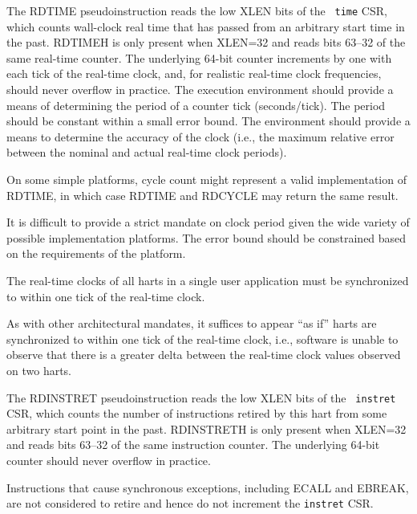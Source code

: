 The RDTIME pseudoinstruction reads the low XLEN bits of the {\tt
  time} CSR, which counts wall-clock real time that has passed from an
arbitrary start time in the past.
RDTIMEH is only present when XLEN=32 and reads bits 63--32 of the same
real-time counter.
The underlying 64-bit counter increments by one with each tick of the
real-time clock, and, for realistic real-time clock frequencies, should never
overflow in practice.
The execution environment should provide a means of determining the period of
a counter tick (seconds/tick).
The period should be constant within a small error bound.
The environment should provide a means to determine the accuracy of the clock
(i.e., the maximum relative error between the nominal and actual real-time
clock periods).

\begin{commentary}
On some simple platforms, cycle count might represent a valid
implementation of RDTIME, in which case RDTIME and RDCYCLE may
return the same result.

It is difficult to provide a strict mandate on clock period given the
wide variety of possible implementation platforms.  The error bound
should be constrained based on the requirements of the platform.
\end{commentary}

The real-time clocks of all harts in a single user application
must be synchronized to within one tick of the real-time clock.

\begin{commentary}
As with other architectural mandates, it suffices to appear ``as if''
harts are synchronized to within one tick of the real-time clock,
i.e., software is unable to observe that there is a greater delta
between the real-time clock values observed on two harts.
\end{commentary}

The RDINSTRET pseudoinstruction reads the low XLEN bits of the {\tt
  instret} CSR, which counts the number of instructions retired by
this hart from some arbitrary start point in the past.  RDINSTRETH is
only present when XLEN=32 and reads bits 63--32 of the same
instruction counter. The underlying 64-bit counter should never
overflow in practice.

\begin{commentary}
Instructions that cause synchronous exceptions, including ECALL and EBREAK,
are not considered to retire and hence do not increment the {\tt instret} CSR.
\end{commentary}

